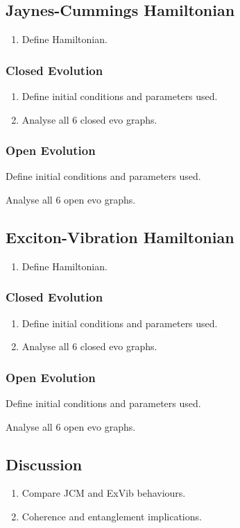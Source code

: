 \documentclass{article}
\begin{document}
\subsection{Jaynes-Cummings Hamiltonian}
\begin{enumerate}
    \item Define Hamiltonian.
\end{enumerate}
\subsubsection{Closed Evolution}
\begin{enumerate}
    \item Define initial conditions and parameters used. 
    \item Analyse all 6 closed evo graphs. 
\end{enumerate}
\subsubsection{Open Evolution}
    \item Define initial conditions and parameters used. 
    \item Analyse all 6 open evo graphs. 
\subsection{Exciton-Vibration Hamiltonian}
\begin{enumerate}
    \item Define Hamiltonian.
\end{enumerate}
\subsubsection{Closed Evolution}
\begin{enumerate}
    \item Define initial conditions and parameters used. 
    \item Analyse all 6 closed evo graphs. 
\end{enumerate}
\subsubsection{Open Evolution}
    \item Define initial conditions and parameters used. 
    \item Analyse all 6 open evo graphs. 
\subsection{Discussion}
\begin{enumerate}
  \item Compare JCM and ExVib behaviours.
  \item Coherence and entanglement implications.
\end{enumerate}
\newpage
\end{document}
